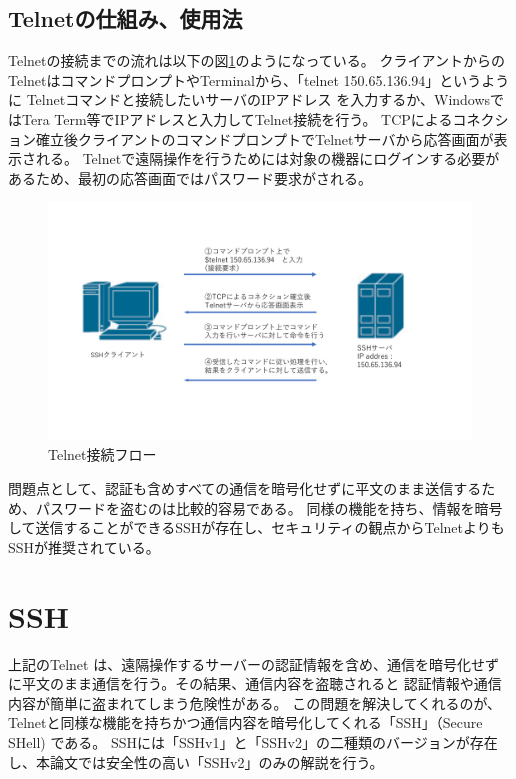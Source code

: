 \documentclass[11pt,a4j,titlepage]{jreport}
\begin{document}
\subsection{Telnetの仕組み、使用法}
Telnetの接続までの流れは以下の図\ref{telnet_flow}のようになっている。
クライアントからのTelnetはコマンドプロンプトやTerminalから、「telnet 150.65.136.94」というように
Telnetコマンドと接続したいサーバのIPアドレス
を入力するか、WindowsではTera Term等でIPアドレスと入力してTelnet接続を行う。
TCPによるコネクション確立後クライアントのコマンドプロンプトでTelnetサーバから応答画面が表示される。
Telnetで遠隔操作を行うためには対象の機器にログインする必要があるため、最初の応答画面ではパスワード要求がされる。

\begin{figure}[H]
    \centering
    \includegraphics*[width=1.0\textwidth,page=1]{graphs/network_archtecture.pdf}
    \caption{Telnet接続フロー}
    \label{telnet_flow}
\end{figure}

問題点として、認証も含めすべての通信を暗号化せずに平文のまま送信するため、パスワードを盗むのは比較的容易である。
同様の機能を持ち、情報を暗号して送信することができるSSHが存在し、セキュリティの観点からTelnetよりもSSHが推奨されている。

\section{SSH}
上記のTelnet は、遠隔操作するサーバーの認証情報を含め、通信を暗号化せずに平文のまま通信を行う。その結果、通信内容を盗聴されると
認証情報や通信内容が簡単に盗まれてしまう危険性がある。
この問題を解決してくれるのが、Telnetと同様な機能を持ちかつ通信内容を暗号化してくれる「SSH」（Secure SHell) \cite{RFC4253}である。
SSHには「SSHv1」と「SSHv2」の二種類のバージョンが存在し、本論文では安全性の高い「SSHv2」のみの解説を行う。
\end{document}
